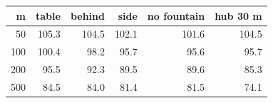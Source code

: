 \begin{tabular}{@{}rrrrrr@{}}
\toprule
m & table & behind & side & no fountain & hub 30 m \\
\midrule
50 & 105.3 & 104.5 & 102.1 & 101.6 & 104.5 \\
100 & 100.4 & 98.2 & 95.7 & 95.6 & 95.7 \\
200 & 95.5 & 92.3 & 89.5 & 89.6 & 85.3 \\
500 & 84.5 & 84.0 & 81.4 & 81.5 & 74.1 \\
\bottomrule
\end{tabular}
